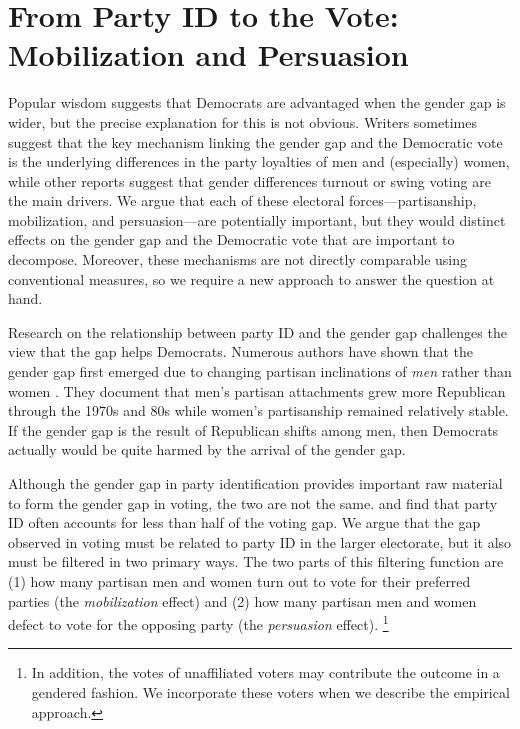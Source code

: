 \documentclass[12pt
               ,final
               ]{article}
\begin{document}
\FloatBarrier
\section*{From Party ID to the Vote: Mobilization and Persuasion}
\label{sec:define-mob-per}


Popular wisdom suggests that Democrats are advantaged when the gender gap is wider, but the precise explanation for this is not obvious. Writers sometimes suggest that the key mechanism linking the gender gap and the Democratic vote is the underlying differences in the party loyalties of men and (especially) women, while other reports suggest that gender differences turnout or swing voting are the main drivers. We argue that each of these electoral forces---partisanship, mobilization, and persuasion---are potentially important, but they would distinct effects on the gender gap and the Democratic vote that are important to decompose. Moreover, these mechanisms are not directly comparable using conventional measures, so we require a new approach to answer the question at hand.

Research on the relationship between party ID and the gender gap challenges the view that the gap helps Democrats. Numerous authors have shown that the gender gap first emerged due to changing partisan inclinations of \emph{men} rather than women \citep{kaufmann1999changing,norrander1999evolution,wirls1986reinterpreting}. They document that men's partisan attachments grew more Republican through the 1970s and 80s while women's partisanship remained relatively stable. If the gender gap is the result of Republican shifts among men, then Democrats actually would be quite harmed by the arrival of the gender gap. 

Although the gender gap in party identification provides important raw material to form the gender gap in voting, the two are not the same. \citet{kaufmann1999changing} and \citet{chaney1998explaining} find that party ID often accounts for less than half of the voting gap. We argue that the gap observed in voting must be related to party ID in the larger electorate, but it also must be filtered in two primary ways. The two parts of this filtering function are (1) how many partisan men and women turn out to vote for their preferred parties (the \emph{mobilization} effect) and (2) how many partisan men and women defect to vote for the opposing party (the \emph{persuasion} effect).%
  \footnote{In addition, the votes of unaffiliated voters may contribute the outcome in a gendered fashion. We incorporate these voters when we describe the empirical approach.}
\end{document}

